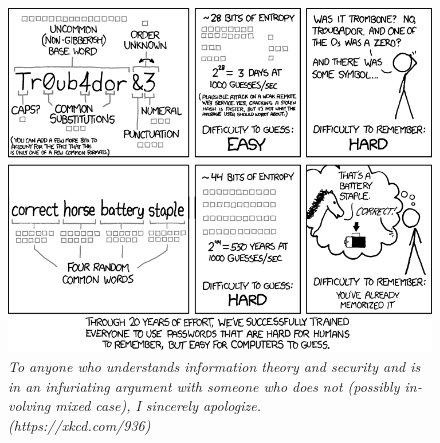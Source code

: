 \begin{figure}[h!]
\centering
\includegraphics[width=.8\linewidth,keepaspectratio]{img/xkcd/password_strength.png}
\caption*{{\small
    \foreignlanguage{english}{
      \textit{To anyone who understands information theory and security and is in an infuriating argument with someone who does not (possibly involving mixed case), I sincerely apologize.\\\hspace*{1mm}\hfill(https://xkcd.com/936)}
    }
  }
}
\end{figure}
